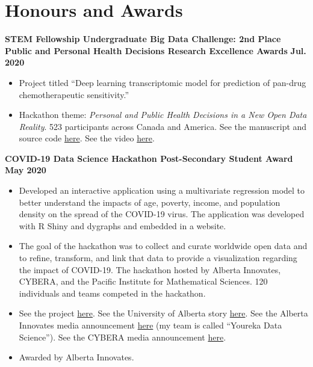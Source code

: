 \documentclass{article}
\begin{document}
\section*{\textcolor{my_red}{Honours and Awards}}
\textbf{STEM Fellowship Undergraduate Big Data Challenge: 2nd Place Public and Personal Health Decisions Research Excellence Awards} \hfill \textbf{Jul. 2020}
\begin{itemize}
    \item Project titled ``Deep learning transcriptomic model for prediction of pan-drug chemotherapeutic sensitivity.''
    \item Hackathon theme: \textit{Personal and Public Health Decisions in a New Open Data Reality}. 523 participants across Canada and America. See the manuscript and source code \href{https://github.com/tig3r66/youreka_genes}{here}. See the video \href{https://youtu.be/MTOuXgh4zqU}{here}.
\end{itemize}
    \textbf{COVID-19 Data Science Hackathon Post-Secondary Student Award} \hfill \textbf{May 2020}
    \begin{itemize}
        \item Developed an interactive application using a multivariate regression model to better understand the impacts of age, poverty, income, and population density on the spread of the COVID-19 virus. The application was developed with R Shiny and dygraphs and embedded in a website.
        \item The goal of the hackathon was to collect and curate worldwide open data and to refine, transform, and link that data to provide a visualization regarding the impact of COVID-19. The hackathon hosted by Alberta Innovates, CYBERA, and the Pacific Institute for Mathematical Sciences. 120 individuals and teams competed in the hackathon.
        \item See the project \href{https://yourekacanada.org/index}{here}. See the University of Alberta story \href{https://www.folio.ca/students-develop-online-tool-to-predict-covid-19-spread-based-on-demographics/}{here}. See the Alberta Innovates media announcement \href{https://albertainnovates.ca/impact/newsroom/flattening-the-curve-and-promoting-economic-recovery-through-innovation}{here} (my team is called ``Youreka Data Science''). See the CYBERA media announcement \href{https://www.cybera.ca/news-and-events/news/covid-19-data-science-hackathon-winners/}{here}.
        \item Awarded by Alberta Innovates.
    \end{itemize}
\end{document}
